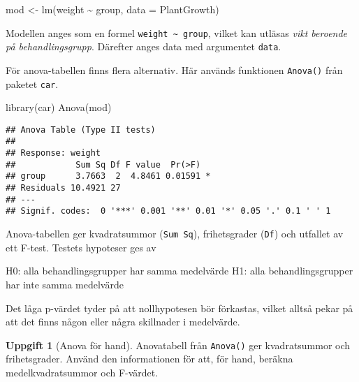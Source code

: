 \documentclass[
]{book}
\newenvironment{Shaded}{\begin{snugshade}}{\end{snugshade}}
\newcommand{\AttributeTok}[1]{\textcolor[rgb]{0.77,0.63,0.00}{#1}}
\newcommand{\FunctionTok}[1]{\textcolor[rgb]{0.00,0.00,0.00}{#1}}
\newcommand{\NormalTok}[1]{#1}
\newcommand{\OtherTok}[1]{\textcolor[rgb]{0.56,0.35,0.01}{#1}}
\newcommand{\SpecialCharTok}[1]{\textcolor[rgb]{0.00,0.00,0.00}{#1}}
\theoremstyle{definition}
\theoremstyle{definition}
\theoremstyle{definition}
\newtheorem{exercise}{Uppgift}[chapter]
\theoremstyle{definition}
\theoremstyle{remark}
\begin{document}
\begin{Shaded}
\begin{Highlighting}[]
\NormalTok{mod }\OtherTok{\textless{}{-}} \FunctionTok{lm}\NormalTok{(weight }\SpecialCharTok{\textasciitilde{}}\NormalTok{ group, }\AttributeTok{data =}\NormalTok{ PlantGrowth)}
\end{Highlighting}
\end{Shaded}

Modellen anges som en formel \texttt{weight\ \textasciitilde{}\ group}, vilket kan utläsas \emph{vikt beroende på behandlingsgrupp}. Därefter anges data med argumentet \texttt{data}.

För anova-tabellen finns flera alternativ. Här används funktionen \texttt{Anova()} från paketet \texttt{car}.

\begin{Shaded}
\begin{Highlighting}[]
\FunctionTok{library}\NormalTok{(car)}
\FunctionTok{Anova}\NormalTok{(mod)}
\end{Highlighting}
\end{Shaded}

\begin{verbatim}
## Anova Table (Type II tests)
## 
## Response: weight
##            Sum Sq Df F value  Pr(>F)  
## group      3.7663  2  4.8461 0.01591 *
## Residuals 10.4921 27                  
## ---
## Signif. codes:  0 '***' 0.001 '**' 0.01 '*' 0.05 '.' 0.1 ' ' 1
\end{verbatim}

Anova-tabellen ger kvadratsummor (\texttt{Sum\ Sq}), frihetsgrader (\texttt{Df}) och utfallet av ett F-test. Testets hypoteser ges av

H0: alla behandlingsgrupper har samma medelvärde
H1: alla behandlingsgrupper har inte samma medelvärde

Det låga p-värdet tyder på att nollhypotesen bör förkastas, vilket alltså pekar på att det finns någon eller några skillnader i medelvärde.

\begin{exercise}[Anova för hand]
Anovatabell från \texttt{Anova()} ger kvadratsummor och frihetsgrader. Använd den informationen för att, för hand, beräkna medelkvadratsummor och F-värdet.
\end{exercise}
\end{document}
